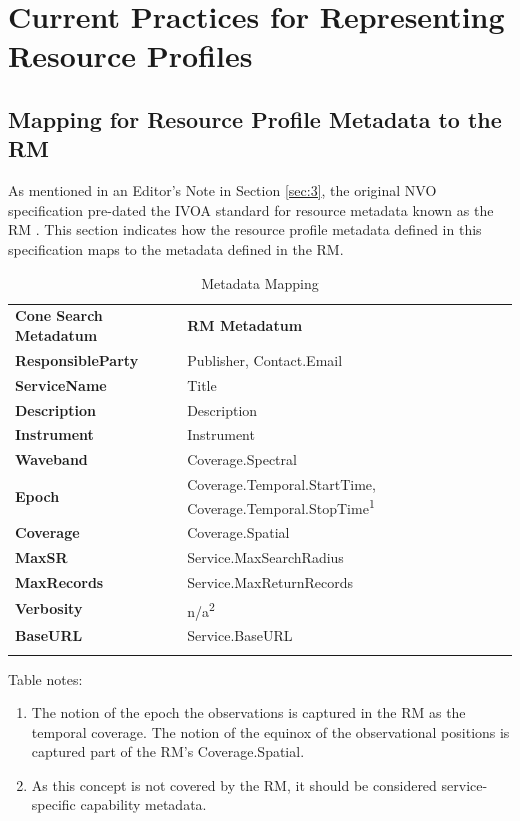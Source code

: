 \documentclass[11pt,a4paper]{ivoa}
\begin{document}
\section{Current Practices for Representing Resource Profiles}

\subsection{Mapping for Resource Profile Metadata to the RM}
As mentioned in an Editor's Note in Section \ref{sec:3}, the original NVO specification pre-dated the IVOA standard for resource metadata known as the RM \citep{STD:RM101}. This section indicates how the resource profile metadata defined in this specification maps to the metadata defined in the RM.
\begin{table}[th]
\begin{tabular}{p{}p{}}
\sptablerule
\textbf{Cone Search Metadatum} & \textbf{RM Metadatum}\\
\sptablerule
\textbf{ResponsibleParty} & Publisher, Contact.Email\\
\textbf{ServiceName} & Title\\
\textbf{Description} & Description\\
\textbf{Instrument} & Instrument\\
\textbf{Waveband} & Coverage.Spectral\\
\textbf{Epoch} & Coverage.Temporal.StartTime, Coverage.Temporal.StopTime\textsuperscript{1}\\
\textbf{Coverage} & Coverage.Spatial\\
\textbf{MaxSR} & Service.MaxSearchRadius\\
\textbf{MaxRecords} & Service.MaxReturnRecords\\
\textbf{Verbosity} & n/a\textsuperscript{2}\\
\textbf{BaseURL} & Service.BaseURL\\
\sptablerule
\caption{Metadata Mapping}
\label{table:b1meta}
\end{tabular}
\end{table}
Table notes:
\begin{enumerate}
	\item The notion of the epoch the observations is captured in the RM as the temporal coverage. The notion of the equinox of the observational positions is captured part of the RM's Coverage.Spatial.
	\item As this concept is not covered by the RM, it should be considered service-specific capability metadata.
\end{enumerate}
\end{document}
